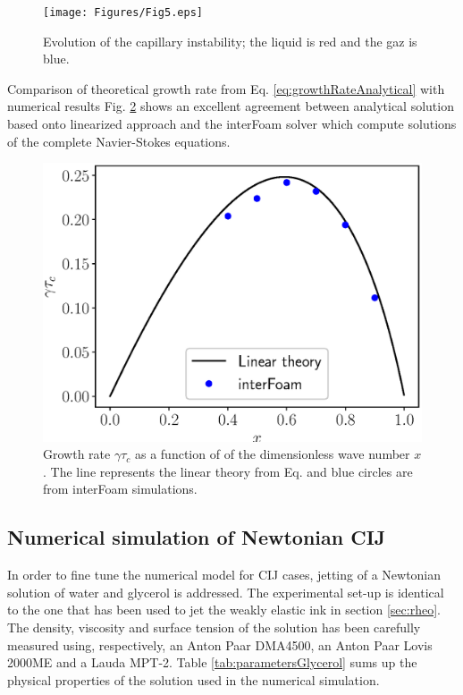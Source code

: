 \documentclass[onecolumn, 12pt]{asme2ej}
\begin{document}
\begin{figure}[t]
    \centering
    \texttt{[image: Figures/Fig5.eps]}
    \caption{Evolution of the capillary instability; the liquid is red and the gaz is blue.} 
    \label{fig:capillaryGrowth}
\end{figure}

Comparison of theoretical growth rate from Eq. \ref{eq:growthRateAnalytical} with numerical results Fig. \ref{fig:growthrate} shows an excellent agreement between analytical solution based onto linearized approach and the interFoam solver which compute solutions of the complete Navier-Stokes equations.

\begin{figure}[h]
    \centering
    \includegraphics[width=15cm]{Figures/Fig6.eps}
    \caption{Growth rate $\gamma \tau_c$ as a function of of the dimensionless wave number $x$. The line represents the linear theory from Eq.\label{eq:growthRateAnalytical} and blue circles are from interFoam simulations.}
    \label{fig:growthrate}
\end{figure}

\subsection{Numerical simulation of Newtonian CIJ}\label{sec:glycerol}
In order to fine tune the numerical model for CIJ cases, jetting of a Newtonian solution of water and glycerol is addressed. The experimental set-up is identical to the one that has been used to jet the weakly elastic ink in section \ref{sec:rheo}. The density, viscosity and surface tension of the solution has been carefully measured using, respectively, an Anton Paar DMA4500, an Anton Paar Lovis 2000ME and a Lauda MPT-2. Table \ref{tab:parametersGlycerol} sums up the physical properties of the solution used in the numerical simulation.
\end{document}
